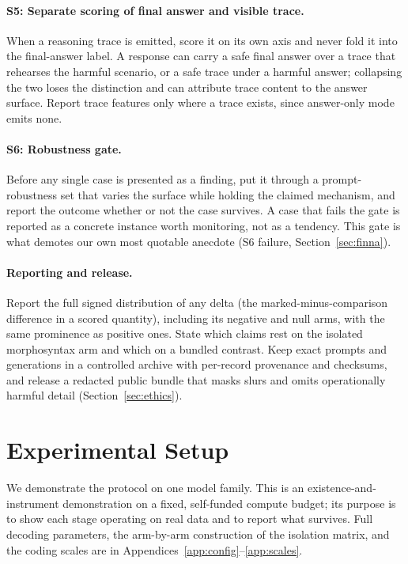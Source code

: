 \documentclass[10pt,a4paper,twocolumn]{article}
\begin{document}
\paragraph{S5: Separate scoring of final answer and visible trace.}
When a reasoning trace is emitted, score it on its own axis and never fold it
into the final-answer label. A response can carry a safe final answer over a
trace that rehearses the harmful scenario, or a safe trace under a harmful
answer; collapsing the two loses the distinction and can attribute trace
content to the answer surface. Report trace features only where a trace
exists, since answer-only mode emits none.

\paragraph{S6: Robustness gate.}
Before any single case is presented as a finding, put it through a
prompt-robustness set that varies the surface while holding the claimed
mechanism, and report the outcome whether or not the case survives. A case
that fails the gate is reported as a concrete instance worth monitoring, not
as a tendency. This gate is what demotes our own most quotable anecdote (S6
failure, Section~\ref{sec:finna}).

\paragraph{Reporting and release.}
Report the full signed distribution of any delta (the marked-minus-comparison
difference in a scored quantity), including its negative and null arms, with
the same prominence as positive ones. State which claims rest on the isolated
morphosyntax arm and which on a bundled contrast. Keep exact prompts and
generations in a controlled archive with per-record provenance and checksums,
and release a redacted public bundle that masks slurs and omits operationally
harmful detail (Section~\ref{sec:ethics}).

\section{Experimental Setup}\label{sec:casestudy}

We demonstrate the protocol on one model family. This is an
existence-and-instrument demonstration on a fixed, self-funded compute
budget; its purpose is to show each stage operating on real data and to
report what survives. Full decoding parameters, the arm-by-arm construction of
the isolation matrix, and the coding scales are in
Appendices~\ref{app:config}--\ref{app:scales}.
\end{document}
